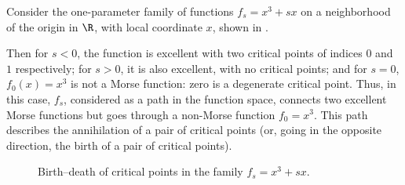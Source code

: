 \begin{example}\label{x:morse-x3}
  Consider the one-parameter family of functions $f_s= x^3+sx$ on a neighborhood
  of the origin in $\R$, with local coordinate $x$, shown in .

  Then for $s<0$, the function is excellent with two critical points of indices
  $0$ and $1$ respectively; for $s>0$, it is also excellent, with no critical
  points; and for $s=0$, $f_0(x)=x^3$ is not a Morse function: zero is a
  degenerate critical point. Thus, in this case, $f_s$, considered as a path in
  the function space, connects two excellent Morse functions but goes through a
  non-Morse function $f_0=x^3$. This path describes the annihilation of a pair
  of critical points (or, going in the opposite direction, the birth of a pair
  of critical points).

  \begin{figure}[ht]
    \centering
    \qquad
    \qquad
    \caption{Birth--death of critical points in the family $f_s=x^3+sx$.}
    \label{fig:x3}
  \end{figure}


\end{example}

